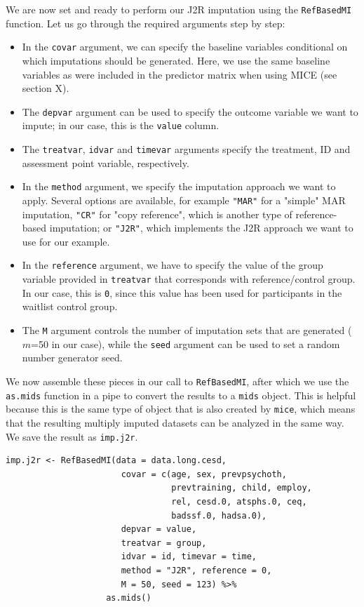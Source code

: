 We are now set and ready to perform our J2R imputation using the \texttt{RefBasedMI} function. Let us go through the required arguments step by step:

\begin{itemize}
    \item In the \texttt{covar} argument, we can specify the baseline variables conditional on which imputations should be generated. Here, we use the same baseline variables as were included in the predictor matrix when using \textsf{MICE} (see section X).
    \item The \texttt{depvar} argument can be used to specify the outcome variable we want to impute; in our case, this is the \texttt{value} column.
    \item The \texttt{treatvar}, \texttt{idvar} and \texttt{timevar} arguments specify the treatment, ID and assessment point variable, respectively.
    \item In the \texttt{method} argument, we specify the imputation approach we want to apply. Several options are available, for example \texttt{"MAR"} for a "simple" MAR imputation, \texttt{"CR"} for "copy reference", which is another type of reference-based imputation; or \texttt{"J2R"}, which implements the J2R approach we want to use for our example.
    \item In the \texttt{reference} argument, we have to specify the value of the group variable provided in \texttt{treatvar} that corresponds with reference/control group. In our case, this is \texttt{0}, since this value has been used for participants in the waitlist control group.
    \item The \texttt{M} argument controls the number of imputation sets that are generated ($m$=50 in our case), while the \texttt{seed} argument can be used to set a random number generator seed. 
\end{itemize}

We now assemble these pieces in our call to \texttt{RefBasedMI}, after which we use the \texttt{as.mids} function in a pipe to convert the results to a \texttt{mids} object. This is helpful because this is the same type of object that is also created by \texttt{mice}, which means that the resulting multiply imputed datasets can be analyzed in the same way. We save the result as \texttt{imp.j2r}.

\begin{lstlisting}
imp.j2r <- RefBasedMI(data = data.long.cesd, 
                       covar = c(age, sex, prevpsychoth,
                                 prevtraining, child, employ,
                                 rel, cesd.0, atsphs.0, ceq,
                                 badssf.0, hadsa.0), 
                       depvar = value, 
                       treatvar = group, 
                       idvar = id, timevar = time, 
                       method = "J2R", reference = 0, 
                       M = 50, seed = 123) %>% 
                    as.mids()
\end{lstlisting}

